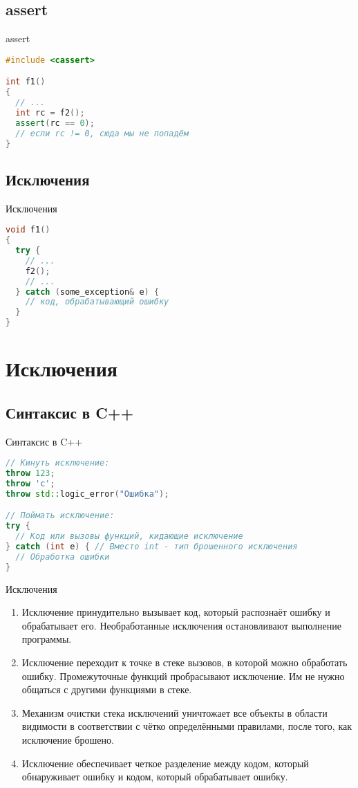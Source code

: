 \documentclass[10pt]{beamer}
\begin{document}
\subsection{assert}
\begin{frame}[fragile]{assert}
\begin{lstlisting}[language=C++]
#include <cassert>

int f1()
{
  // ...
  int rc = f2();
  assert(rc == 0);
  // если rc != 0, сюда мы не попадём
}
\end{lstlisting}
\end{frame}

\subsection{Исключения}
\begin{frame}[fragile]{Исключения}
\begin{lstlisting}[language=C++]
void f1()
{
  try {
    // ...
    f2();
    // ...
  } catch (some_exception& e) {
    // код, обрабатывающий ошибку
  }
}
\end{lstlisting}
\end{frame}

\section{Исключения}
\subsection{Синтаксис в C++}
\begin{frame}[fragile]{Синтаксис в C++}
\begin{lstlisting}[language=C++]
// Кинуть исключение:
throw 123;
throw 'c';
throw std::logic_error("Ошибка");

// Поймать исключение:
try {
  // Код или вызовы функций, кидающие исключение
} catch (int e) { // Вместо int - тип брошенного исключения
  // Обработка ошибки
}
\end{lstlisting}
\end{frame}

\begin{frame}[fragile]{Исключения}
\begin{enumerate}
    \item Исключение принудительно вызывает код, который распознаёт ошибку и обрабатывает его. Необработанные исключения остановливают выполнение программы.
    \item Исключение переходит к точке в стеке вызовов, в которой можно обработать ошибку. Промежуточные функций пробрасывают исключение. Им не нужно общаться с другими функциями в стеке.
    \item Механизм очистки стека исключений уничтожает все объекты в области видимости в соответствии с чётко определёнными правилами, после того, как исключение брошено.
    \item Исключение обеспечивает четкое разделение между кодом, который обнаруживает ошибку и кодом, который обрабатывает ошибку.
\end{enumerate}
\end{frame}
\end{document}
